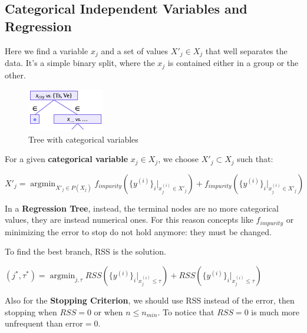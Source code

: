 \subsection{Categorical Independent Variables and Regression}

Here we find a variable $x_j$ and a set of values $X'_j \in X_j$ that well separates the data. It's a simple binary split, where the $x_j$ is contained either in a group or the other.

\begin{center}
    \begin{figure}[H]
        \centering 
        \includegraphics[width=0.3\textwidth]{assets/fig19.png}
        \caption{Tree with categorical variables}
    \end{figure}
\end{center}

For a given \textbf{categorical variable} $x_j \in X_j$, we choose $X'_j \subset X_j$ such that:

\begin{center}
    $X'_j = \operatorname*{argmin}_{X'_j \in P(X_j)} f_{impurity}(\{y^{(i)}\}_i |_{x^{(i)}_j \in X'_j}) + f_{impurity}(\{y^{(i)}\}_i |_{x^{(i)}_j \in X'_j})$
\end{center}

In a \textbf{Regression Tree}, instead, the terminal nodes are no more categorical values, they are instead numerical ones. For this reason concepts like $f_{impurity}$ or minimizing the error to stop do not hold anymore: they must be changed.

To find the best branch, RSS is the solution. 

\begin{center}
    $(j^*, \tau^*) = \operatorname*{argmin}_{j, \tau} RSS(\{y^{(i)}\}_i |_{x^{(i)}_j \leq \tau}) + RSS(\{y^{(i)}\}_i |_{x^{(i)}_j \leq \tau})$
\end{center}

Also for the \textbf{Stopping Criterion}, we should use RSS instead of the error, then stopping when $RSS=0$ or when $n \leq n_{min}$. To notice that $RSS=0$ is much more unfrequent than error$=0$.

